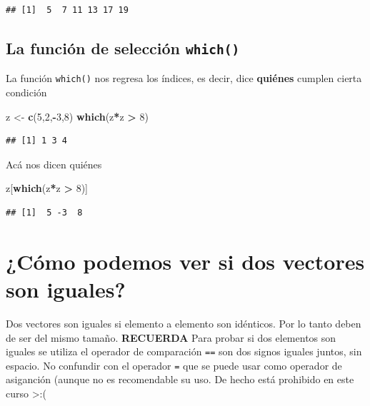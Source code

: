 \documentclass[
]{book}
\newenvironment{Shaded}{\begin{snugshade}}{\end{snugshade}}
\newcommand{\DecValTok}[1]{\textcolor[rgb]{0.00,0.00,0.81}{#1}}
\newcommand{\FunctionTok}[1]{\textcolor[rgb]{0.13,0.29,0.53}{\textbf{#1}}}
\newcommand{\NormalTok}[1]{#1}
\newcommand{\OtherTok}[1]{\textcolor[rgb]{0.56,0.35,0.01}{#1}}
\newcommand{\SpecialCharTok}[1]{\textcolor[rgb]{0.81,0.36,0.00}{\textbf{#1}}}
\begin{document}
\begin{verbatim}
## [1]  5  7 11 13 17 19
\end{verbatim}

\hypertarget{la-funciuxf3n-de-selecciuxf3n-which}{%
\subsection{\texorpdfstring{La función de selección \texttt{which()}}{La función de selección which()}}\label{la-funciuxf3n-de-selecciuxf3n-which}}

La función \texttt{which()} nos regresa los índices, es decir, dice \textbf{quiénes} cumplen cierta condición

\begin{Shaded}
\begin{Highlighting}[]
\NormalTok{z }\OtherTok{\textless{}{-}} \FunctionTok{c}\NormalTok{(}\DecValTok{5}\NormalTok{,}\DecValTok{2}\NormalTok{,}\SpecialCharTok{{-}}\DecValTok{3}\NormalTok{,}\DecValTok{8}\NormalTok{)}
\FunctionTok{which}\NormalTok{(z}\SpecialCharTok{*}\NormalTok{z }\SpecialCharTok{\textgreater{}} \DecValTok{8}\NormalTok{)}
\end{Highlighting}
\end{Shaded}

\begin{verbatim}
## [1] 1 3 4
\end{verbatim}

Acá nos dicen quiénes

\begin{Shaded}
\begin{Highlighting}[]
\NormalTok{z[}\FunctionTok{which}\NormalTok{(z}\SpecialCharTok{*}\NormalTok{z }\SpecialCharTok{\textgreater{}} \DecValTok{8}\NormalTok{)]}
\end{Highlighting}
\end{Shaded}

\begin{verbatim}
## [1]  5 -3  8
\end{verbatim}

\hypertarget{cuxf3mo-podemos-ver-si-dos-vectores-son-iguales}{%
\section{¿Cómo podemos ver si dos vectores son iguales?}\label{cuxf3mo-podemos-ver-si-dos-vectores-son-iguales}}

Dos vectores son iguales si elemento a elemento son idénticos.
Por lo tanto deben de ser del mismo tamaño.
\textbf{RECUERDA} Para probar si dos elementos son iguales se utiliza el operador de comparación \texttt{==} son dos signos iguales juntos, sin espacio.
No confundir con el operador \texttt{=} que se puede usar como operador de asiganción (aunque no es recomendable su uso. De hecho está prohibido en este curso \textgreater:(
\end{document}
